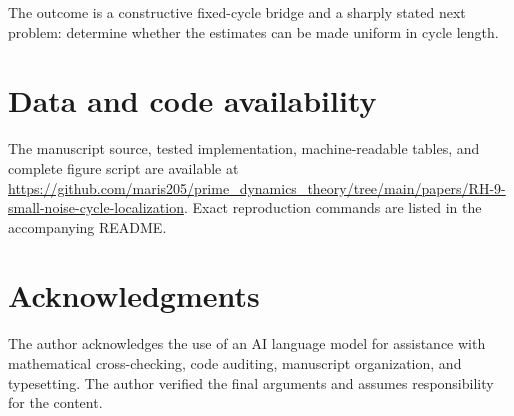 \documentclass[11pt]{article}
\theoremstyle{remark}
\begin{document}
The outcome is a constructive fixed-cycle bridge and a sharply stated next
problem: determine whether the estimates can be made uniform in cycle length.

\section*{Data and code availability}

The manuscript source, tested implementation, machine-readable tables, and
complete figure script are available at
\url{https://github.com/maris205/prime_dynamics_theory/tree/main/papers/RH-9-small-noise-cycle-localization}.
Exact reproduction commands are listed in the accompanying README.

\section*{Acknowledgments}

The author acknowledges the use of an AI language model for assistance with
mathematical cross-checking, code auditing, manuscript organization, and
typesetting.  The author verified the final arguments and assumes
responsibility for the content.

{\small


}
\end{document}
